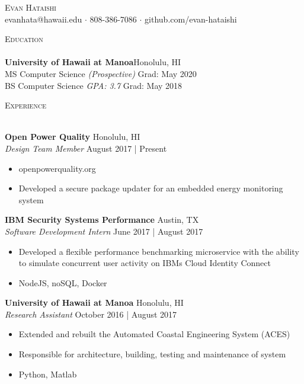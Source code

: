 \documentclass[a4paper]{article}
\newcommand{\lineunder} {
    \vspace*{-8pt} \\
    \hspace*{-18pt} \hrulefill \\
}
\newcommand{\header} [1] {
    {\hspace*{-18pt}\vspace*{6pt} \textsc{#1}}
    \vspace*{-6pt} \lineunder
}
\begin{document}
\vspace*{-40pt}

\vspace*{-10pt}
\begin{center}
	{\Huge \scshape {Evan Hataishi}}\\
	evanhata@hawaii.edu $\cdot$ 808-386-7086 $\cdot$ github.com/evan-hataishi\\
\end{center}

\vspace*{2mm}

\header{Education}
\textbf{University of Hawaii at Manoa}\hfill Honolulu, HI\\
MS Computer Science \textit{(Prospective)} \hfill Grad: May 2020\\
BS Computer Science \textit{GPA: 3.7} \hfill Grad: May 2018\\
\vspace{2mm}

\vspace*{2mm}

\header{Experience}
\vspace{1mm}

\textbf{Open Power Quality} \hfill Honolulu, HI\\
\textit{Design Team Member} \hfill August 2017 | Present\\
\vspace{-1mm}
\begin{itemize} \itemsep 1pt
	\item openpowerquality.org
	\item Developed a secure package updater for an embedded energy monitoring system
\end{itemize}

\textbf{IBM Security Systems Performance} \hfill Austin, TX\\
\textit{Software Development Intern} \hfill June 2017 | August 2017\\
\vspace{-1mm}
\begin{itemize} \itemsep 1pt
	\item Developed a flexible performance benchmarking microservice with the ability to simulate concurrent user activity on IBM\textquotesingle{}s Cloud Identity Connect
	\item NodeJS, noSQL, Docker
\end{itemize}

\textbf{University of Hawaii at Manoa} \hfill Honolulu, HI\\
\textit{Research Assistant} \hfill October 2016 | August 2017\\
\vspace{-1mm}
\begin{itemize} \itemsep 1pt
	\item Extended and rebuilt the Automated Coastal Engineering System (ACES)
	\item Responsible for architecture, building, testing and maintenance of system
	\item Python, Matlab
\end{itemize}
\end{document}
